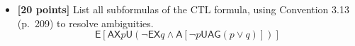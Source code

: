 \documentclass{article}
\def\Forever{\mathord{\mathsf{G}}}
\def\NextX{\mathord{\mathsf{X}}}
\def\Until{\mathrel{\mathsf{U}}}
\def\All{\mathord{\mathsf{A}}}
\def\Exists{\mathord{\mathsf{E}}}
\begin{document}
\begin{itemize}

\item \textbf{[20 points]} List all subformulas of the CTL formula,
  using Convention 3.13 (p.\ 209) to resolve ambiguities.
  \begin{displaymath}
    \Exists [\All \NextX p \Until (\neg \Exists \NextX q \land \All
    [\neg p \Until \All \Forever (p \lor q)])]
  \end{displaymath}
\end{itemize}
\end{document}
